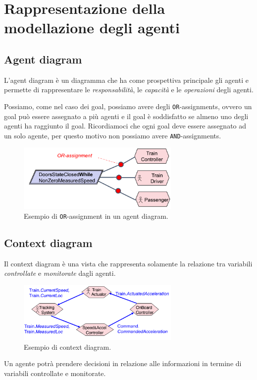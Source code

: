 \section{Rappresentazione della modellazione degli agenti}
\subsection{Agent diagram}
\begin{tcolorbox}[colback=blue!5!white,colframe=blue!75!black, title=Agent diagram]
    L'agent diagram è un diagramma che ha come prospettiva principale gli agenti
    e permette di rappresentare le \textit{responsabilità}, le \textit{capacità} e le
    \textit{operazioni} degli agenti.
\end{tcolorbox}
Possiamo, come nel caso dei goal, possiamo avere degli \texttt{OR}-assignments, ovvero
un goal può essere assegnato a più agenti e il goal è soddisfatto se almeno uno degli
agenti ha raggiunto il goal. Ricordiamoci che ogni goal deve essere assegnato ad un
solo agente, per questo motivo non possiamo avere \texttt{AND}-assignments.
\begin{figure}[H]
    \centering
    \includegraphics[width=0.7\textwidth]{img/agentdiagram.png}
    \caption{Esempio di \texttt{OR}-assignment in un agent diagram.}
    \label{fig:agentdiagram}
\end{figure}
\subsection{Context diagram}
\begin{tcolorbox}[colback=cyan!5!white,colframe=cyan!75!black, title=Context diagram]
    Il context diagram è una vista che rappresenta solamente la relazione tra variabili 
    \textit{controllate} e \textit{monitorate} dagli agenti.
\end{tcolorbox}
\begin{figure}[H]
    \centering
    \includegraphics[width=0.7\textwidth]{img/contextdiagram.png}
    \caption{Esempio di context diagram.}
    \label{fig:contextdiagram}
\end{figure}
Un agente potrà prendere decisioni in relazione alle informazioni in termine di 
variabili controllate e monitorate.
